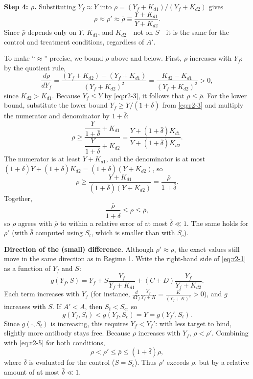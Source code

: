 \textbf{Step 4: $\rho$.} Substituting $Y_f\approx Y$ into
$\rho=(Y_f+K_{d1})/(Y_f+K_{d2})$ gives
\begin{equation}
\rho\approx\rho'\approx\bar\rho\equiv\frac{Y+K_{d1}}{Y+K_{d2}}.
\label{eq:r2-4}
\end{equation}
Since $\bar\rho$ depends only on $Y$, $K_{d1}$, and $K_{d2}$---not on
$S$---it is the same for the control and treatment conditions,
regardless of $A'$.

To make ``$\approx$'' precise, we bound $\rho$ above and below. First,
$\rho$ increases with $Y_f$: by the quotient rule,
$$
\frac{d\rho}{dY_f}
=\frac{(Y_f+K_{d2})-(Y_f+K_{d1})}{(Y_f+K_{d2})^2}
=\frac{K_{d2}-K_{d1}}{(Y_f+K_{d2})^2}
>0,
$$
since $K_{d2}>K_{d1}$. Because $Y_f\le Y$ by \eqref{eq:r2-3}, it follows
that $\rho\le\bar\rho$. For the lower bound, substitute the lower bound
$Y_f\ge Y/(1+\bar\delta)$ from \eqref{eq:r2-3} and multiply the numerator
and denominator by $1+\bar\delta$:
$$
\rho
\ge\frac{\dfrac{Y}{1+\bar\delta}+K_{d1}}{\dfrac{Y}{1+\bar\delta}+K_{d2}}
=\frac{Y+(1+\bar\delta)K_{d1}}{Y+(1+\bar\delta)K_{d2}}.
$$
The numerator is at least $Y+K_{d1}$, and the denominator is at most
$(1+\bar\delta)Y+(1+\bar\delta)K_{d2}=(1+\bar\delta)(Y+K_{d2})$, so
$$
\rho\ge\frac{Y+K_{d1}}{(1+\bar\delta)(Y+K_{d2})}=\frac{\bar\rho}{1+\bar\delta}.
$$
Together,
\begin{equation}
\frac{\bar\rho}{1+\bar\delta}\le\rho\le\bar\rho,
\label{eq:r2-5}
\end{equation}
so $\rho$ agrees with $\bar\rho$ to within a relative error of at most
$\bar\delta\ll1$. The same holds for $\rho'$ (with $\bar\delta$ computed
using $S_t$, which is smaller than with $S_c$).

\textbf{Direction of the (small) difference.} Although $\rho'\approx\rho$,
the exact values still move in the same direction as in Regime 1. Write
the right-hand side of \eqref{eq:r2-1} as a function of $Y_f$ and $S$:
$$
g(Y_f,S)=Y_f+S\frac{Y_f}{Y_f+K_{d1}}+(C+D)\frac{Y_f}{Y_f+K_{d2}}.
$$
Each term increases with $Y_f$ (for instance,
$\frac{d}{dY_f}\frac{Y_f}{Y_f+K}=\frac{K}{(Y_f+K)^2}>0$), and $g$ increases
with $S$. If $A'<A$, then $S_t<S_c$, so
$$
g(Y_f,S_t)<g(Y_f,S_c)=Y=g(Y_f',S_t).
$$
Since $g(\cdot,S_t)$ is increasing, this requires $Y_f<Y_f'$: with less
target to bind, slightly more antibody stays free. Because $\rho$
increases with $Y_f$, $\rho<\rho'$. Combining with \eqref{eq:r2-5} for
both conditions,
\begin{equation}
\rho<\rho'\le\bar\rho\le(1+\bar\delta)\rho,
\label{eq:r2-6}
\end{equation}
where $\bar\delta$ is evaluated for the control ($S=S_c$). Thus $\rho'$
exceeds $\rho$, but by a relative amount of at most $\bar\delta\ll1$.

